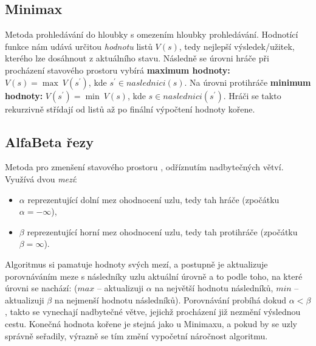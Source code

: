 \subsection*{Minimax}
Metoda \cite{AI1} prohledávání do hloubky s omezením hloubky prohledávání. Hodnotící funkce nám udává určitou \textit{hodnotu} listů $V(s)$, tedy nejlepší výsledek/užitek, kterého lze dosáhnout z aktuálního stavu.
Následně se úrovni hráče při procházení stavového prostoru vybírá \textbf{maximum hodnoty:} $V(s) = \max \: V(s^\prime)$, kde $s^\prime \in naslednici(s)$. 
\newline
Na úrovni protihráče \textbf{minimum hodnoty:} $V(s^\prime) = \min \: V(s)$, kde $s \in naslednici(s^\prime)$. Hráči se takto rekurzivně střídají od listů až po finální výpočtení hodnoty kořene.

\subsection*{AlfaBeta řezy}
Metoda pro zmenšení stavového prostoru \cite{AI1}, odříznutím nadbytečných větví. Využívá dvou \textit{mezí}:
\begin{itemize}
\item \boldmath$\alpha$ reprezentující dolní mez ohodnocení uzlu, tedy tah hráče (zpočátku $\alpha = -\infty $),
\item \boldmath$\beta$ reprezentující horní mez ohodnocení uzlu, tedy tah protihráče (zpočátku $\beta = \infty $).
\end{itemize}
Algoritmus si pamatuje hodnoty svých mezí, a postupně je aktualizuje porovnáváním meze s následníky uzlu aktuální úrovně a to podle toho, na které úrovni se nachází: ($max$ -- aktualizuji $\alpha$ na největší hodnotu následníků, $min$ -- aktualizuji $\beta$ na nejmenší hodnotu následníků). Porovnávání probíhá dokud $\alpha < \beta$, takto se vynechají nadbytečné větve, jejichž procházení již nezmění výslednou cestu. Konečná hodnota kořene je stejná jako u Minimaxu, a pokud by se uzly správně seřadily, výrazně se tím změní vypočetní náročnost algoritmu.
 
